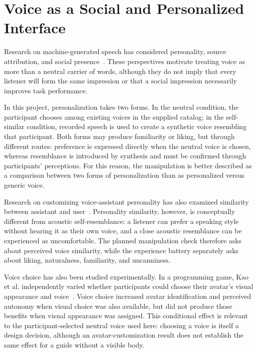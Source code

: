 \section{Voice as a Social and Personalized Interface}
Research on machine-generated speech has considered personality, source attribution, and social presence~\cite{nass1993voices,nass2001personality,lee2005socialpresence}. These perspectives motivate treating voice as more than a neutral carrier of words, although they do not imply that every listener will form the same impression or that a social impression necessarily improves task performance.

In this project, personalization takes two forms. In the neutral condition, the participant chooses among existing voices in the supplied catalog; in the self-similar condition, recorded speech is used to create a synthetic voice resembling that participant. Both forms may produce familiarity or liking, but through different routes: preference is expressed directly when the neutral voice is chosen, whereas resemblance is introduced by synthesis and must be confirmed through participants' perceptions. For this reason, the manipulation is better described as a comparison between two forms of personalization than as personalized versus generic voice.

Research on customizing voice-assistant personality has also examined similarity between assistant and user~\cite{snyder2023onevoice}. Personality similarity, however, is conceptually different from acoustic self-resemblance: a listener can prefer a speaking style without hearing it as their own voice, and a close acoustic resemblance can be experienced as uncomfortable. The planned manipulation check therefore asks about perceived voice similarity, while the experience battery separately asks about liking, naturalness, familiarity, and uncanniness.

Voice choice has also been studied experimentally. In a programming game, Kao et al. independently varied whether participants could choose their avatar's visual appearance and voice~\cite{kao2022audiomatters}. Voice choice increased avatar identification and perceived autonomy when visual choice was also available, but did not produce those benefits when visual appearance was assigned. This conditional effect is relevant to the participant-selected neutral voice used here: choosing a voice is itself a design decision, although an avatar-customization result does not establish the same effect for a guide without a visible body.

